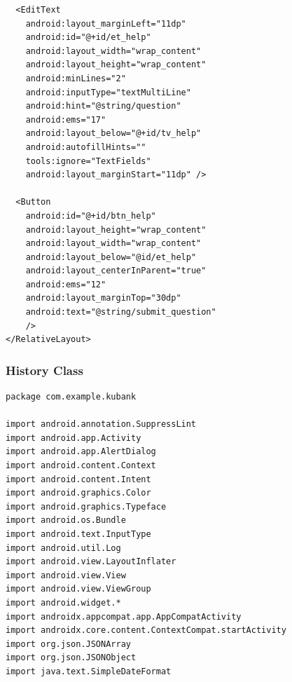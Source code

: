 \documentclass[11pt, a4paper]{article}
\begin{document}
\begin{appendices}
\begin{lstlisting}
  <EditText
    android:layout_marginLeft="11dp"
    android:id="@+id/et_help"
    android:layout_width="wrap_content"
    android:layout_height="wrap_content"
    android:minLines="2"
    android:inputType="textMultiLine"
    android:hint="@string/question"
    android:ems="17"
    android:layout_below="@+id/tv_help"
    android:autofillHints=""
    tools:ignore="TextFields"
    android:layout_marginStart="11dp" />

  <Button
    android:id="@+id/btn_help"
    android:layout_height="wrap_content"
    android:layout_width="wrap_content"
    android:layout_below="@id/et_help"
    android:layout_centerInParent="true"
    android:ems="12"
    android:layout_marginTop="30dp"
    android:text="@string/submit_question"
    />
</RelativeLayout>
\end{lstlisting}
\subsubsection{History Class}
\begin{lstlisting}
package com.example.kubank

import android.annotation.SuppressLint
import android.app.Activity
import android.app.AlertDialog
import android.content.Context
import android.content.Intent
import android.graphics.Color
import android.graphics.Typeface
import android.os.Bundle
import android.text.InputType
import android.util.Log
import android.view.LayoutInflater
import android.view.View
import android.view.ViewGroup
import android.widget.*
import androidx.appcompat.app.AppCompatActivity
import androidx.core.content.ContextCompat.startActivity
import org.json.JSONArray
import org.json.JSONObject
import java.text.SimpleDateFormat



\end{lstlisting}
\end{appendices}
\end{document}

